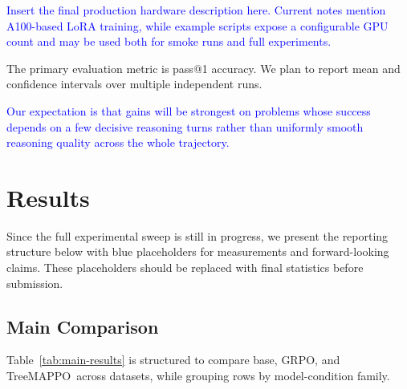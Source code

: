 \documentclass[letterpaper]{article} %
\newcommand{\ours}{TreeMAPPO}
\newcommand{\expected}[1]{\textcolor{blue}{#1}}
\newcommand{\draftnote}[1]{\textcolor{blue}{#1}}
\begin{document}
\draftnote{Insert the final production hardware description here. Current notes mention A100-based LoRA training, while example scripts expose a configurable GPU count and may be used both for smoke runs and full experiments.}

The primary evaluation metric is pass@1 accuracy. We plan to report mean and confidence intervals over multiple independent runs.

\expected{Our expectation is that gains will be strongest on problems whose success depends on a few decisive reasoning turns rather than uniformly smooth reasoning quality across the whole trajectory.}

\section{Results}
Since the full experimental sweep is still in progress, we present the reporting structure below with blue placeholders for measurements and forward-looking claims. These placeholders should be replaced with final statistics before submission.

\subsection{Main Comparison}
Table~\ref{tab:main-results} is structured to compare base, GRPO, and \ours\ across datasets, while grouping rows by model-condition family.
\end{document}
